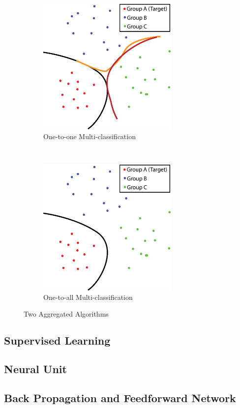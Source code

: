 \begin{spacing}{1.5}
\begin{figure}[th]
    \centering
    \begin{subfigure}[b]{0.49\textwidth}
        \centering
        \includegraphics[width=2.7in, fbox]{Chapter2/1to1.eps}
        \caption{One-to-one Multi-classification}
        \label{fig:121} 
    \end{subfigure}%
    ~
    \begin{subfigure}[b]{0.49\textwidth}
        \centering
        \includegraphics[width=2.7in, fbox]{Chapter2/1toall.eps}
        \caption{One-to-all Multi-classification}
        \label{fig:12all} 
    \end{subfigure}
    \caption{Two Aggregated Algorithms}
\end{figure}


\subsection{Supervised Learning}

\subsection{Neural Unit}

\subsection{Back Propagation and Feedforward Network}


\end{spacing}
